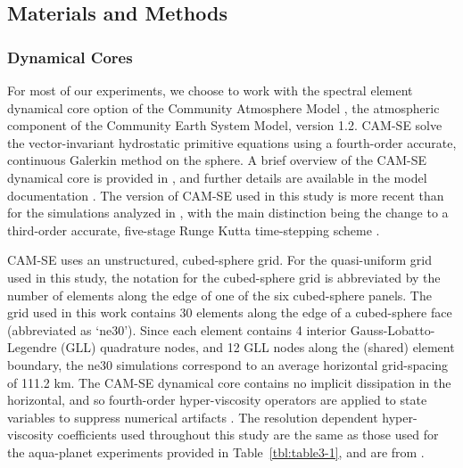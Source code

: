 \subsection{Materials and Methods}
\subsubsection{Dynamical Cores}
For most of our experiments, we choose to work with the spectral element dynamical core option of the Community Atmosphere Model \citep[CAM-SE;][]{DetAl2012IJHPCA}, the atmospheric component of the Community Earth System Model, version 1.2. CAM-SE solve the vector-invariant hydrostatic primitive equations using a fourth-order accurate, continuous Galerkin method on the sphere. A brief overview of the CAM-SE dynamical core is provided in \cite{HR2017JCLIM}, and further details are available in the model documentation \citep{CAM5}. The version of CAM-SE used in this study is more recent than for the simulations analyzed in \cite{HR2017JCLIM}, with the main distinction being the change to a third-order accurate, five-stage Runge Kutta time-stepping scheme \citep{DetAl2012IJHPCA,GU2016GMD}.

CAM-SE uses an unstructured, cubed-sphere grid. For the quasi-uniform grid used in this study, the notation for the cubed-sphere grid is abbreviated by the number of elements along the edge of one of the six cubed-sphere panels. The grid used in this work contains 30 elements along the edge of a cubed-sphere face (abbreviated as ‘ne30’). Since each element contains 4 interior Gauss-Lobatto-Legendre (GLL) quadrature nodes, and 12 GLL nodes along the (shared) element boundary, the ne30 simulations correspond to an average horizontal grid-spacing of 111.2 km. The CAM-SE dynamical core contains no implicit dissipation in the horizontal, and so fourth-order hyper-viscosity operators are applied to state variables to suppress numerical artifacts \citep{DetAl2012IJHPCA}. The resolution dependent hyper-viscosity coefficients used throughout this study are the same as those used for the aqua-planet experiments provided in Table~\ref{tbl:table3-1}, and are from \cite{ZetAl2014JC}.

